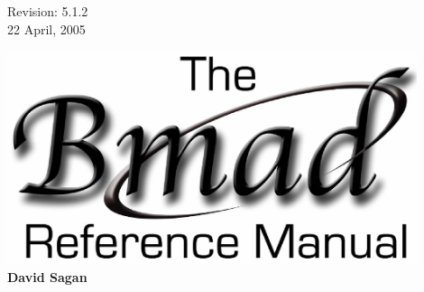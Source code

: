 \thispagestyle{empty}

\begin{flushright}
\large
  Revision: 5.1.2 \\
  22 April, 2005 \\
\end{flushright}

\vfill

{
\begin{center}
\includegraphics[width=12cm]{bmad_ref_manual.eps} \\
\vskip 0.3in
\huge\bf David Sagan
\end{center}
}

\vfill
\break